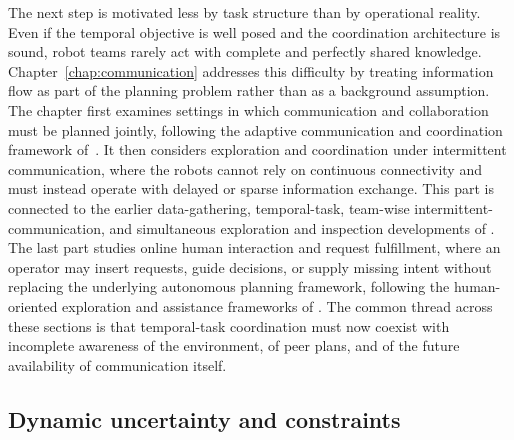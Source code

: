 The next step is motivated less by task structure than by operational reality.
Even if the temporal objective is well posed and the coordination architecture
is sound, robot teams rarely act with complete and perfectly shared knowledge.
Chapter~\ref{chap:communication} addresses this difficulty by treating
information flow as part of the planning problem rather than as a background
assumption.
The chapter first examines settings in which communication and collaboration
must be planned jointly, following the adaptive communication and coordination
framework of~\citet{zhang2026cocoplan}. It then considers exploration and
coordination under intermittent communication, where the robots cannot rely on
continuous connectivity and must instead operate with delayed or sparse
information exchange. This part is connected to the earlier data-gathering,
temporal-task, team-wise intermittent-communication, and simultaneous
exploration and inspection developments of
\citet{guo2018multirobot,kantaros2019temporal,wang2026decentralized,chen2026slei3d}.
The last part studies online human interaction and request fulfillment, where
an operator may insert requests, guide decisions, or supply missing intent
without replacing the underlying autonomous planning framework, following the
human-oriented exploration and assistance frameworks of
\citet{jhunjhunwala2021ihero,zhang2025flykites,tian2026bodyguards}.
The common thread across these sections
is that temporal-task coordination must now coexist with incomplete awareness
of the environment, of peer plans, and of the future availability of
communication itself.

\subsection{Dynamic uncertainty and constraints}
\label{sec:ch01:outline:uncertainty}

